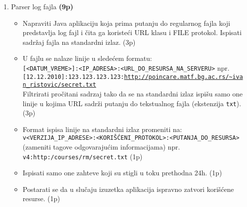 \documentclass[]{article}
\begin{document}
\begin{enumerate}
  \item Parser log fajla \textbf{(9p)}
  \begin{itemize}
    \item Napraviti Java aplikaciju koja prima putanju do regularnog fajla koji predstavlja log fajl i \v{c}ita ga koriste\'c{}i URL klasu i FILE protokol. Ispisati sadr\v{z}aj fajla na standardni izlaz. \hfill (3p)
    \item U fajlu se nalaze linije u slede\'c{}em formatu:\\
    \texttt{[<DATUM\_VREME>]:<IP\_ADRESA>:<URL\_DO\_RESURSA\_NA\_SERVERU>} npr.\\
    \texttt{[12.12.2010]:123.123.123.123:\url{http://poincare.matf.bg.ac.rs/~ivan_ristovic/secret.txt}}\\
    Filtrirati pro\v{c}itani sadrzaj tako da se na standardni izlaz ispi\v{s}u samo one linije u kojima URL sadr\v{z}i putanju do tekstualnog fajla (ekstenzija \texttt{txt}). \hfill (3p)
    \item Format ispisa linije na standardni izlaz promeniti na:\\
    \texttt{v<VERZIJA\_IP\_ADRESE>:<KORI\v{S}\'C{}ENI\_PROTOKOL>:<PUTANJA\_DO\_RESURSA>} (zameniti tagove odgovaraju\'c{}im informacijama) npr.\\
    \texttt{v4:http:/courses/rm/secret.txt} \hfill (1p)
    \item Ispisati samo one zahteve koji su stigli u toku prethodna 24h. \hfill (1p)
    \item Postarati se da u slu\v{c}aju izuzetka aplikacija ispravno zatvori kori\v{s}\'c{}ene resurse. \hfill (1p)
  \end{itemize}
\end{enumerate}
\end{document}
